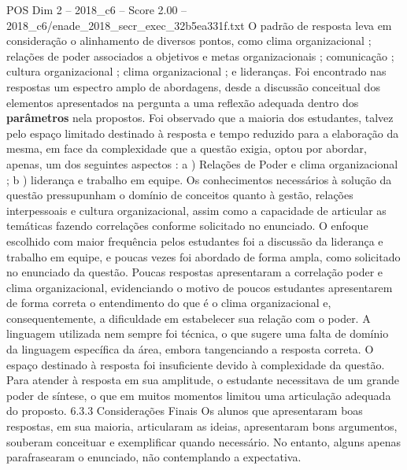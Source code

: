 \begin{textsample}{POS Dim 2 – 2018\_c6 – Score 2.00 – 2018\_c6/enade\_2018\_secr\_exec\_32b5ea331f.txt}
O padrão de resposta leva em consideração o alinhamento de diversos pontos, como clima organizacional ; relações de poder associados a objetivos e metas organizacionais ; comunicação ; cultura organizacional ; clima organizacional ; e lideranças.
Foi encontrado nas respostas um espectro amplo de abordagens, desde a discussão conceitual dos elementos apresentados na pergunta a uma reflexão adequada dentro dos \textbf{parâmetros} nela propostos.
Foi observado que a maioria dos estudantes, talvez pelo espaço limitado destinado à resposta e tempo reduzido para a elaboração da mesma, em face da complexidade que a questão exigia, optou por abordar, apenas, um dos seguintes aspectos : a ) Relações de Poder e clima organizacional ; b ) liderança e trabalho em equipe.
Os conhecimentos necessários à solução da questão pressupunham o domínio de conceitos quanto à gestão, relações interpessoais e cultura organizacional, assim como a capacidade de articular as temáticas fazendo correlações conforme solicitado no enunciado.
O enfoque escolhido com maior frequência pelos estudantes foi a discussão da liderança e trabalho em equipe, e poucas vezes foi abordado de forma ampla, como solicitado no enunciado da questão.
Poucas respostas apresentaram a correlação poder e clima organizacional, evidenciando o motivo de poucos estudantes apresentarem de forma correta o entendimento do que é o clima organizacional e, consequentemente, a dificuldade em estabelecer sua relação com o poder.
A linguagem utilizada nem sempre foi técnica, o que sugere uma falta de domínio da linguagem específica da área, embora tangenciando a resposta correta.
O espaço destinado à resposta foi insuficiente devido à complexidade da questão.
Para atender à resposta em sua amplitude, o estudante necessitava de um grande poder de síntese, o que em muitos momentos limitou uma articulação adequada do proposto. 6.3.3 Considerações Finais Os alunos que apresentaram boas respostas, em sua maioria, articularam as ideias, apresentaram bons argumentos, souberam conceituar e exemplificar quando necessário.
No entanto, alguns apenas parafrasearam o enunciado, não contemplando a expectativa.

\end{textsample}
